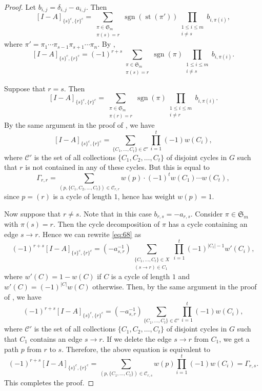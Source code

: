 \documentclass[oneside]{book}
\numberwithin{equation}{section}
\theoremstyle{definition}
\newcommand\st{\operatorname{st}}
\newcommand\sgn{\operatorname{sgn}}
\newcommand\sym{\mathfrak{S}}
\begin{document}
\begin{proof}
  Let \( b_{i,j} = \delta_{i,j} - a_{i,j}\). 
  Then
  \[
    [I-A]_{\{s\}^c,\{r\}^c}
    = \sum_{\substack{\pi\in \sym_m\\ \pi(s) = r}} 
    \sgn(\st(\pi')) \prod_{\substack{1\le i\le m \\ i\ne s}} b_{i,\pi(i)},
  \]
  where \( \pi' = \pi_1 \cdots \pi_{s-1} \pi_{s+1} \cdots \pi_n \).
  By ,
  \begin{equation}\label{eq:68}
    [I-A]_{\{s\}^c,\{r\}^c}
    = (-1)^{r+s} \sum_{\substack{\pi\in \sym_m\\ \pi(s) = r}} 
    \sgn(\pi) \prod_{\substack{1\le i\le m \\ i\ne s}} b_{i,\pi(i)}.
  \end{equation}

  Suppose that \( r=s \). Then
  \[
    [I-A]_{\{s\}^c,\{r\}^c}
    = \sum_{\substack{\pi\in \sym_m\\ \pi(r) = r}} 
    \sgn(\pi) \prod_{\substack{1\le i\le m \\ i\ne r}} b_{i,\pi(i)}.
  \]
  By the same argument in the proof of , we have
\[
  [I-A]_{\{s\}^c,\{r\}^c}= \sum_{\{C_1 , \dots , C_t\}\in \mathcal{C}'}
  \prod_{i=1}^{t} (-1) w(C_i),
\]
where \( \mathcal{C}' \) is the set of all collections
\( \{C_1, C_2,\dots,C_t\} \) of disjoint cycles in \( G \) such that
\( r \) is not contained in any of these cycles.
But this is equal to
\[
  \Gamma_{r,r} = \sum_{(p,\{C_1, C_2,\dots,C_t\})\in
    \mathcal{C}_{r,r}} w(p) \cdot (-1)^{t} w(C_1) \cdots w(C_t),
\]
since \( p = (r) \) is a cycle of length \( 1 \), hence has weight
\( w(p) = 1 \).

Now suppose that \( r\ne s \). Note that in this case
\( b_{r,s} = -a_{r,s} \). Consider \( \pi\in \sym_m \) with
\( \pi(s) = r \). Then the cycle decomposition of \( \pi \) has a
cycle containing an edge \( s\to r \). Hence we can rewrite
\eqref{eq:68} as
  \[
    (-1)^{r+s} [I-A]_{\{s\}^c,\{r\}^c}
    = (-a_{s,r}^{-1}) \sum_{\substack{\{C_1 , \dots , C_t\}\in X \\ (s\to r)\in C_1}}
  \prod_{i=1}^{t} (-1)^{|C_i|-1} w'(C_i),
  \]
  where \( w'(C) = 1-w(C) \) if \( C \) is a cycle of length \( 1 \)
  and \( w'(C) = (-1)^{|C|} w(C) \) otherwise. Then, by the same
  argument in the proof of , we have
\[
  (-1)^{r+s} [I-A]_{\{s\}^c,\{r\}^c}
  = (-a_{s,r}^{-1}) \sum_{\{C_1 , \dots , C_t\}\in \mathcal{C}'}
  \prod_{i=1}^{t} (-1) w(C_i),
\]
where \( \mathcal{C}' \) is the set of all collections
\( \{C_1, C_2,\dots,C_t\} \) of disjoint cycles in \( G \) such that
\( C_1 \) contains an edge \( s\to r \). If we delete the edge
\( s\to r \) from \( C_1 \), we get a path \( p \) from \( r \) to
\( s \). Therefore, the above equation is equivalent to
\[
  (-1)^{r+s} [I-A]_{\{s\}^c,\{r\}^c}
  = \sum_{(p,\{C_1 , \dots , C_t\})\in \mathcal{C}_{r,s}}
  w(p) \prod_{i=1}^{t} (-1) w(C_i) = \Gamma_{r,s}.
\]
This completes the proof.
\end{proof}
\end{document}
